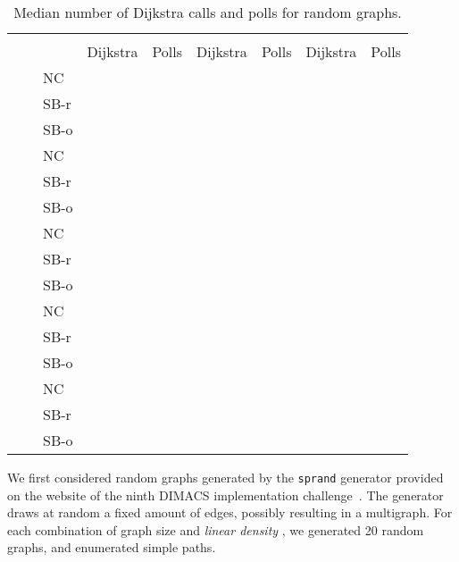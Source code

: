 \documentclass[runningheads,a4paper]{llncs}
\begin{document}
\begin{table}[tb]
\scriptsize
\centering
\begin{tabularx}{1\textwidth}{p{0.8cm}p{0.8cm}p{0.8cm}|RR|RR|RR}
 & & &  &  &  \\
 \centering  & \centering  & & Dijkstra & Polls & Dijkstra & Polls & Dijkstra & Polls \\
\hline
\centering{} & \centering{} & \centering NC &  &  &  &  &  &  \\
 & & \centering SB-r  &  &  &  &  &  &  \\
 & & \centering SB-o  &  &  &  &  &  &  \\
 & \centering{} & \centering NC &  &  &  &  &  &  \\
 & & \centering SB-r  &  &  &  &  &  &  \\
 & & \centering SB-o  &  &  &  &  &  &  \\
 & \centering{} & \centering NC &  &  &  &  &  &  \\
 & & \centering SB-r  &  &  &  &  &  &  \\
 & & \centering SB-o  &  &  &  &  &  &  \\
 & \centering{} & \centering NC &  &  &  &  &  &  \\
 & & \centering SB-r  &  &  &  &  &  &  \\
 & & \centering SB-o  &  &  &  &  &  &  \\
 & \centering{} & \centering NC &  &  &  &  &  &  \\
 & & \centering SB-r  &  &  &  &  &  &  \\
 & & \centering SB-o  &  &  &  &  &  &  \\
\end{tabularx}
\vspace{2mm}
\caption{Median number of Dijkstra calls and polls for random graphs.}
\label{table:dijkstras}
\end{table}

We first considered random graphs generated by the \texttt{sprand} generator provided on the website of the ninth DIMACS implementation challenge~\cite{CUSTUM:dimacs9}.
The generator draws at random a fixed amount of edges, possibly resulting in a multigraph.
For each combination of graph size  and \emph{linear density} , we generated 20 random graphs, and enumerated  simple paths.
\end{document}

